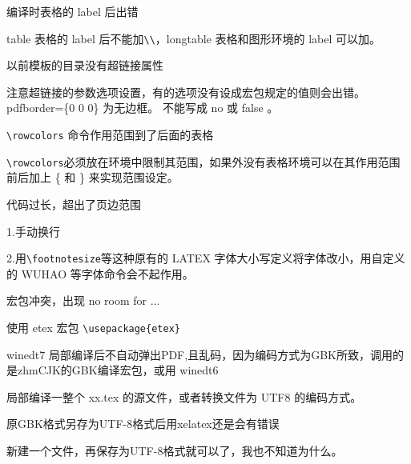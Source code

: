 \begin{list}
\item
\color{red}
编译时表格的 label 后出错\\
\normalcolor

table 表格的 label 后不能加\verb|\\|，longtable 表格和图形环境的
label 可以加。

\item
\color{red}
以前模板的目录没有超链接属性\\
\normalcolor

注意超链接的参数选项设置，有的选项没有设成宏包规定的值则会出错。 pdfborder=\{0 0 0\} 为无边框。 不能写成 no 或 false 。



\item
\color{red}
\verb|\rowcolors| 命令作用范围到了后面的表格\\
\normalcolor

\verb|\rowcolors|必须放在环境中限制其范围，如果外没有表格环境可以在其作用范围前后加上 \{ 和 \} 来实现范围设定。


\item
\color{red}
代码过长，超出了页边范围\\
\normalcolor

1.手动换行

2.用\verb|\footnotesize|等这种原有的 LATEX 字体大小写定义将字体改小，用自定义的 WUHAO 等字体命令会不起作用。


\item
\color{red}
宏包冲突，出现 no room for ... \\
\normalcolor

 使用 etex 宏包 \verb|\usepackage{etex}|


\item
\color{red}
winedt7 局部编译后不自动弹出PDF,且乱码，因为编码方式为GBK所致，调用的是zhmCJK的GBK编译宏包，或用 winedt6\\
\normalcolor

 局部编译一整个 xx.tex 的源文件，或者转换文件为 UTF8 的编码方式。


\item
\color{red}
原GBK格式另存为UTF-8格式后用xelatex还是会有错误\\
\normalcolor

 新建一个文件，再保存为UTF-8格式就可以了，我也不知道为什么。



\end{list}
